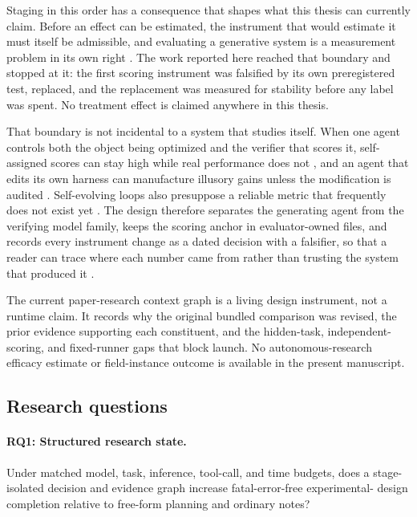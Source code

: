\documentclass[11pt,a4paper]{article}
\begin{document}
Staging in this order has a consequence that shapes what this thesis can
currently claim.  Before an effect can be estimated, the instrument that would
estimate it must itself be admissible, and evaluating a generative system is a
measurement problem in its own right \citep{genaimeasurement2025}.  The work
reported here reached that boundary and stopped at it: the first scoring
instrument was falsified by its own preregistered test, replaced, and the
replacement was measured for stability before any label was spent.  No treatment
effect is claimed anywhere in this thesis.

That boundary is not incidental to a system that studies itself.  When one agent
controls both the object being optimized and the verifier that scores it,
self-assigned scores can stay high while real performance does not
\citep{verifiergap2026}, and an agent that edits its own harness can manufacture
illusory gains unless the modification is audited \citep{harnesstamper2026}.
Self-evolving loops also presuppose a reliable metric that frequently does not
exist yet \citep{whogrades2026}.  The design therefore separates the generating
agent from the verifying model family, keeps the scoring anchor in evaluator-owned
files, and records every instrument change as a dated decision with a falsifier,
so that a reader can trace where each number came from rather than trusting the
system that produced it \citep{auditablewriting2026}.

The current paper-research context graph is a living design instrument, not a
runtime claim.  It records why the original bundled comparison was revised, the
prior evidence supporting each constituent, and the hidden-task, independent-
scoring, and fixed-runner gaps that block launch.  No autonomous-research
efficacy estimate or field-instance outcome is available in the present
manuscript.

\subsection{Research questions}

\paragraph{RQ1: Structured research state.}
Under matched model, task, inference, tool-call, and time budgets, does a
stage-isolated decision and evidence graph increase fatal-error-free experimental-
design completion relative to free-form planning and ordinary notes?
\end{document}

